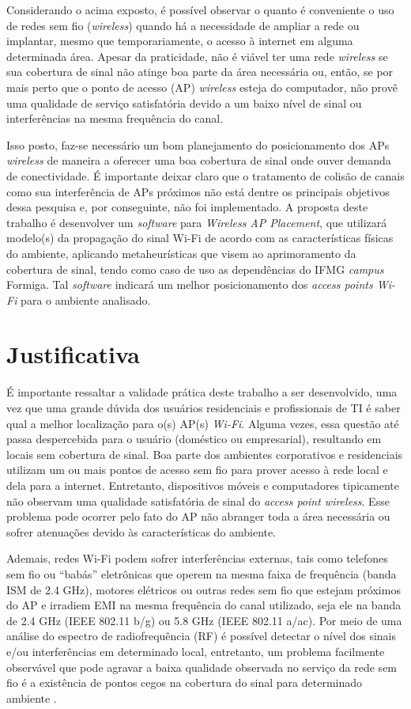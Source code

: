 \documentclass[
	12pt,				%
	twoside,			%
	a4paper,			%
	english,			%
	french,				%
	spanish,			%
	brazil				%
	]{abntex2}
\begin{document}
Considerando o acima exposto, é possível observar o quanto é conveniente
o uso de redes sem fio (\emph{wireless}) quando há a necessidade de
ampliar a rede ou implantar, mesmo que temporariamente, o acesso à
internet em alguma determinada área. Apesar da praticidade, não é viável
ter uma rede \emph{wireless} se sua cobertura de sinal não atinge boa
parte da área necessária ou, então, se por mais perto que o ponto de
acesso (AP) \emph{wireless} esteja do computador, não provê uma
qualidade de serviço satisfatória devido a um baixo nível de sinal ou
interferências na mesma frequência do canal.

Isso posto, faz-se necessário um bom planejamento do posicionamento dos
APs \emph{wireless} de maneira a oferecer uma boa cobertura de sinal
onde ouver demanda de conectividade. É importante deixar claro que o
tratamento de colisão de canais como sua interferência de APs próximos
não está dentre os principais objetivos dessa pesquisa e, por
conseguinte, não foi implementado. A proposta deste trabalho é
desenvolver um \emph{software} para \emph{Wireless AP Placement}, que
utilizará modelo(s) da propagação do sinal Wi-Fi de acordo com as
características físicas do ambiente, aplicando metaheurísticas que visem
ao aprimoramento da cobertura de sinal, tendo como caso de uso as
dependências do IFMG \emph{campus} Formiga. Tal \emph{software} indicará
um melhor posicionamento dos \emph{access points Wi-Fi} para o ambiente
analisado.

\section{Justificativa}\label{justificativa}

É importante ressaltar a validade prática deste trabalho a ser
desenvolvido, uma vez que uma grande dúvida dos usuários residenciais e
profissionais de TI é saber qual a melhor localização para o(s) AP(s)
\emph{Wi-Fi}. Alguma vezes, essa questão até passa despercebida para o
usuário (doméstico ou empresarial), resultando em locais sem cobertura
de sinal. Boa parte dos ambientes corporativos e residenciais utilizam
um ou mais pontos de acesso sem fio para prover acesso à rede local e
dela para a internet. Entretanto, dispositivos móveis e computadores
tipicamente não observam uma qualidade satisfatória de sinal do
\emph{access point wireless}. Esse problema pode ocorrer pelo fato do AP
não abranger toda a área necessária ou sofrer atenuações devido às
características do ambiente.

Ademais, redes Wi-Fi podem sofrer interferências externas, tais como
telefones sem fio ou ``babás'' eletrônicas que operem na mesma faixa de
frequência (banda ISM de 2.4 GHz), motores elétricos ou outras redes sem
fio que estejam próximos do AP e irradiem EMI na mesma frequência do
canal utilizado, seja ele na banda de 2.4 GHz (IEEE 802.11 b/g) ou 5.8
GHz (IEEE 802.11 a/ac). Por meio de uma análise do espectro de
radiofrequência (RF) é possível detectar o nível dos sinais e/ou
interferências em determinado local, entretanto, um problema facilmente
observável que pode agravar a baixa qualidade observada no serviço da
rede sem fio é a existência de pontos cegos na cobertura do sinal para
determinado ambiente \cite{RUBINSTEINS}.
\end{document}
